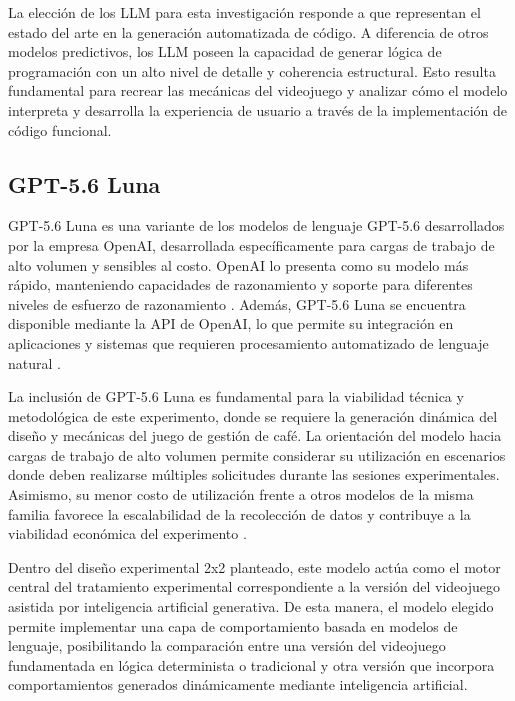 La elección de los LLM para esta investigación responde a que representan el estado del arte en la generación automatizada de código. A diferencia de otros modelos predictivos, los LLM poseen la capacidad de generar lógica de programación con un alto nivel de detalle y coherencia estructural. Esto resulta fundamental para recrear las mecánicas del videojuego y analizar cómo el modelo interpreta y desarrolla la experiencia de usuario a través de la implementación de código funcional.

\subsection{GPT-5.6 Luna}

GPT-5.6 Luna es una variante de los modelos de lenguaje GPT-5.6 desarrollados por la empresa OpenAI, desarrollada específicamente para cargas de trabajo de alto volumen y sensibles al costo. OpenAI lo presenta como su modelo más rápido, manteniendo capacidades de razonamiento y soporte para diferentes niveles de esfuerzo de razonamiento \cite{openai_gpt56_luna_2026}. Además, GPT-5.6 Luna se encuentra disponible mediante la API de OpenAI, lo que permite su integración en aplicaciones y sistemas que requieren procesamiento automatizado de lenguaje natural \cite{openai_gpt56_api_2026}.

La inclusión de GPT-5.6 Luna es fundamental para la viabilidad técnica y metodológica de este experimento, donde se requiere la generación dinámica del diseño y mecánicas del juego de gestión de café. La orientación del modelo hacia cargas de trabajo de alto volumen permite considerar su utilización en escenarios donde deben realizarse múltiples solicitudes durante las sesiones experimentales. Asimismo, su menor costo de utilización frente a otros modelos de la misma familia favorece la escalabilidad de la recolección de datos y contribuye a la viabilidad económica del experimento \cite{openai_gpt56_luna_2026,openai_gpt56_api_2026}.

Dentro del diseño experimental 2x2 planteado, este modelo actúa como el motor central del tratamiento experimental correspondiente a la versión del videojuego asistida por inteligencia artificial generativa. De esta manera, el modelo elegido permite implementar una capa de comportamiento basada en modelos de lenguaje, posibilitando la comparación entre una versión del videojuego fundamentada en lógica determinista o tradicional y otra versión que incorpora comportamientos generados dinámicamente mediante inteligencia artificial.

